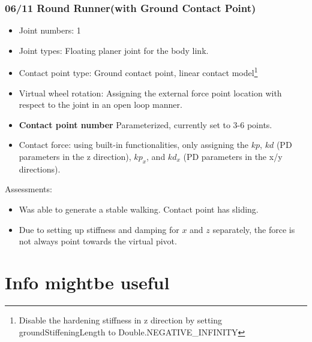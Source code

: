 \documentclass{article}
\begin{document}
\subsubsection*{06/11 Round Runner(with Ground Contact Point)}
\begin{itemize}
\item Joint numbers: 1
\item Joint types: Floating planer joint for the body link.
\item Contact point type: Ground contact point, linear contact model\footnote[1]{Disable the hardening stiffness in z direction by setting groundStiffeningLength to Double.NEGATIVE\_INFINITY}
\item Virtual wheel rotation: Assigning the external force point location with respect to the joint in an open loop manner.
\item \textbf{Contact point number} Parameterized, currently set to 3-6 points.
\item
Contact force: using built-in functionalities, only assigning the $kp$, $kd$ (PD parameters in the z direction), $kp_x$, and $kd_x$ (PD parameters in the x/y directions).
\end{itemize}



Assessments:
\begin{itemize}
\item Was able to generate a stable walking. Contact point has sliding.
\item Due to setting up stiffness and damping for $x$ and $z$ separately, the force is not always point towards the virtual pivot.

\end{itemize}

\section{Info mightbe useful}
\end{document}
